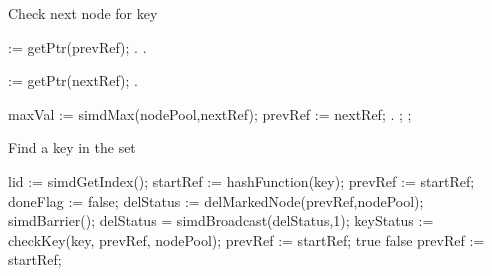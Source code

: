 \documentclass[11pt,onecolumn]{IEEEtran}
\begin{document}
\begin{algorithm}
  \caption{Check next node for key}
  \label{alg:check}
  \begin{algorithmic}[5]
        := getPtr(prevRef);
         \State
         .
       \EndIf
         \State
         .
       \EndIf

        := getPtr(nextRef);
         \State
         .
       \EndIf
         
       \State maxVal := simdMax(nodePool,nextRef);
            \State prevRef := nextRef;
            .
         \Else
               \State
               ;
           \Else
               \State               
               ;   
           \EndIf   
         \EndIf
    \EndFunction
  \end{algorithmic}
\end{algorithm}

\begin{algorithm}
  \caption{Find a key in the set}
  \label{alg:find}
  \begin{algorithmic}[5]
       \State lid := simdGetIndex();
       \State startRef := hashFunction(key);
       \State prevRef  := startRef;
       \State doneFlag := false;
             \State delStatus := delMarkedNode(prevRef,nodePool);
          \EndIf
          \State simdBarrier();
          \State delStatus = simdBroadcast(delStatus,1);
             \State keyStatus := checkKey(key, prevRef, nodePool);
                \State prevRef := startRef;
                \State 
                \Return true
                \State 
                \Return false
             \EndIf
          \Else
             \State prevRef := startRef;   
          \EndIf
       \EndWhile
    \EndFunction
  \end{algorithmic}
\end{algorithm}
\end{document}
